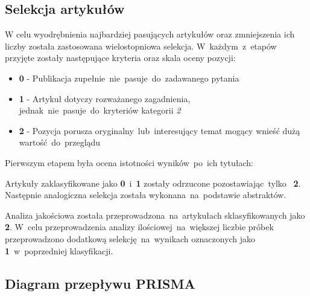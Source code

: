 \subsection{Selekcja artykułów}
W celu wyodrębnienia najbardziej pasujących artykułów oraz zmniejszenia ich liczby została zastosowana wielostopniowa selekcja. W~każdym~z~etapów przyjęte zostały następujące kryteria oraz skala oceny pozycji:
\begin{itemize}
    \item {\bf 0} - Publikacja zupełnie~nie~pasuje~do~zadawanego pytania
    \item {\bf 1} - Artykuł dotyczy rozważanego zagadnienia, jednak~nie~pasuje~do~kryteriów kategorii {\it 2}
    \item {\bf 2} - Pozycja porusza oryginalny~lub~interesujący temat mogący wnieść dużą wartość~do~przeglądu
\end{itemize}
Pierwszym etapem była ocena istotności wyników~po~ich tytułach:

Artykuły zaklasyfikowane jako {\bf0}~i~{\bf1} zostały odrzucone pozostawiając~tylko~ {\bf2}. Następnie analogiczna selekcja została wykonana~na~podstawie abstraktów.

Analiza jakościowa została przeprowadzona~na~artykułach sklasyfikowanych jako \textbf{2}. W~celu przeprowadzenia analizy ilościowej~na~większej liczbie próbek przeprowadzono dodatkową selekcję~na~wynikach oznaczonych jako \textbf{1}~w~poprzedniej klasyfikacji.


\subsection{Diagram przepływu PRISMA}
\begin{figure}[H]
	\centering
	
	\label{fig:prisma_diagram}
\end{figure}
